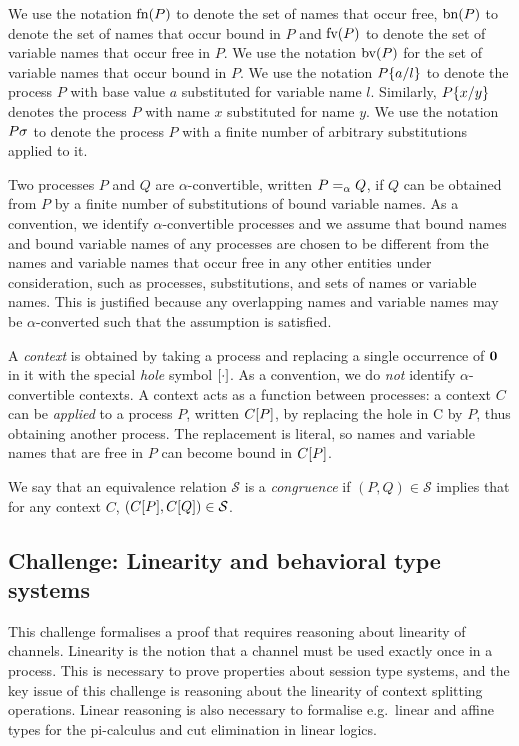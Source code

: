 \documentclass[runningheads]{llncs}
\begin{document}
We use the notation \( \textrm{fn}(P) \) to denote the set of
names that occur free,
\( \textrm{bn}(P) \) to denote the set of names that occur bound
in \( P \) and  \( \textrm{fv}(P) \)
to denote the set of variable names that occur free
in \( P \).  We use the notation \( \textrm{bv}(P) \)
for the set of variable names that occur bound
in \( P \).  We use the notation \( P\{a/l\} \) to denote
the process \( P \) with base value \( a \) substituted for variable name
\( l \). Similarly, \( P\{x/y\} \) denotes the process
\( P \) with name \( x \) substituted for name \( y \).
We use the notation \( P\sigma \) to denote the process \( P \) with a finite number of arbitrary substitutions applied to it.

Two processes \( P \) and \( Q \) are \( \alpha \)-convertible,
written \( P =_{\alpha} Q \), if \( Q \) can be obtained from \( P \)
by a finite number of substitutions of bound variable names.  As a
convention, we identify \( \alpha \)-convertible processes and we
assume that bound names and bound variable names of any processes are
chosen to be different from the names and variable names that occur
free in any other entities under consideration, such as processes,
substitutions, and sets of names or variable names.  This is justified
because any overlapping names and variable names may be
\( \alpha \)-converted such that the assumption is satisfied.


A \emph{context} is obtained by taking a process and replacing a single occurrence of \( \bm{0} \) in it with the special \emph{hole} symbol \( [\cdot] \).
As a convention, we do \emph{not} identify \( \alpha \)-convertible contexts.
%
A context acts as a function between processes:
a context \( C \) can be \emph{applied} to a process \( P \), written \( C[P] \), by replacing the hole in C by \( P \), thus obtaining another process.
The replacement is literal, so names and variable names that are free in \( P \) can become bound in \( C[P] \).

We say that an equivalence relation \( \mathcal{S} \) is a \emph{congruence} if \( (P,Q) \in \mathcal{S} \) implies that for any context \( C \), \( (C[P], C[Q]) \in \mathcal{S} \).

\subsection{Challenge: Linearity and behavioral type systems}
\label{sec:challenge:linearity-beh-types}
This challenge formalises a proof that requires reasoning about linearity of channels.
Linearity is the notion that a channel must be used exactly once in a process.
This is necessary to prove properties about session type systems, and the key
issue of this challenge is reasoning about the linearity of context splitting operations.
Linear reasoning is also necessary to formalise e.g.\ linear and affine types for the pi-calculus and cut elimination in linear logics.
\end{document}
